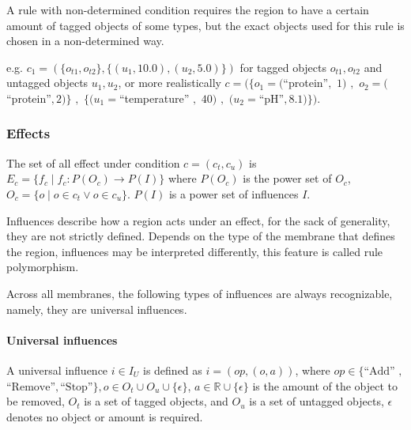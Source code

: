 \documentclass[9pt,a4paper,twoside]{article}
\begin{document}
                A rule with non-determined condition requires the region to have a certain amount of tagged objects of some types, 
                but the exact objects used for this rule is chosen in a non-determined way.
                
                e.g. 
                $c_1 = (\{o_{t1}, o_{t2}\}, \{(u_1, 10.0), (u_2, 5.0)\})$ for tagged objects $o_{t1}, o_{t2}$ and untagged objects $u_1, u_2$,
                or more realistically
                $c = (\{ o_1=($``protein''$,$ $1)$ $,$ $ o_2=($``protein''$,$$ 2) \}$ $,$ $ \{(u_1=$``temperature'' $,$
                $40)$ $,$ $ (u_2=$``pH''$,$$ 8.1)\})$.
            
        \subsubsection{Effects}
                
            The set of all effect under condition $c=(c_t, c_u)$ is $E_c = \{ f_c \mid f_c: P(O_c) \rightarrow P(I) \}$  where $P(O_c)$ is the power set of 
            $O_c$, $O_c = \{o \mid o \in c_t \vee o \in c_u\}$. $P(I)$ is a power set of influences $I$. 
        
            Influences describe how a region acts under an effect, for the sack of generality, they are not strictly defined. 
            Depends on the type of the membrane that defines the region, influences may be interpreted differently, this feature is called rule polymorphism. 
            
            Across all membranes, the following types of influences are always recognizable, namely, they are universal influences.
            \paragraph{Universal influences}
                A universal influence $i \in I_U$ is defined as $i = (op, (o,a))$, where $op \in \{\text{``Add''}$ $,$ $ \text{``Remove''}, \text{``Stop''}\}$$,$$ o \in O_t \cup O_u \cup \{\epsilon\}$,
                $a \in \mathbb{R} \cup \{\epsilon\}$ is the amount of the object to be removed, $O_t$ is a set of tagged objects, and $O_u$ is a set of untagged objects, 
                $\epsilon$ denotes no object or amount is required. 
                
\end{document}
